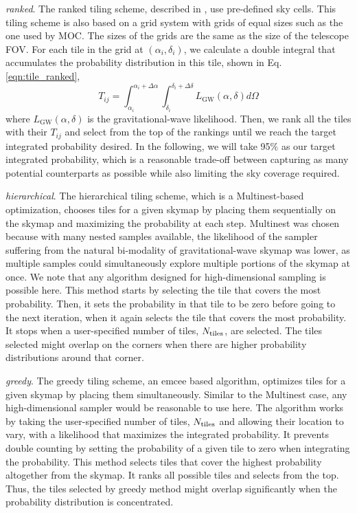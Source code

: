\documentclass[twocolumn]{aastex62}
\begin{document}
\emph{ranked}. The ranked tiling scheme, described in \cite{GhBl2016}, use pre-defined sky cells. This tiling scheme is also based on a grid system with grids of equal sizes such as the one used by MOC. The sizes of the grids are the same as the size of the telescope FOV. For each tile in the grid at $(\alpha_i, \delta_i)$, we calculate a double integral that accumulates the probability distribution in this tile, shown in Eq.\ref{eqn:tile_ranked},
\begin{equation}\label{eqn:tile_ranked}
T_{ij} = \int_{\alpha_i}^{\alpha_i+\Delta \alpha}\int_{\delta_i}^{\delta_i+\Delta \delta}L_\textrm{GW}(\alpha,\delta)d\Omega
\end{equation}
where $L_\textrm{GW}(\alpha,\delta)$ is the gravitational-wave likelihood.
Then, we rank all the tiles with their $T_{ij}$ and select from the top of the rankings until we reach the target integrated probability desired.
In the following, we will take 95\% as our target integrated probability, which is a reasonable trade-off between capturing as many potential counterparts as possible while also limiting the sky coverage required.

\emph{hierarchical}. The hierarchical tiling scheme, which is a Multinest-based \citep{FeHo2009,FeGa2009,BuGe2014} optimization, chooses tiles for a given skymap by placing them sequentially on the skymap and maximizing the probability at each step. Multinest was chosen because with many nested samples available, the likelihood of the sampler suffering from the natural bi-modality of gravitational-wave skymap was lower, as multiple samples could simultaneously explore multiple portions of the skymap at once. We note that any algorithm designed for high-dimensional sampling is possible here. This method starts by selecting the tile that covers the most probability. Then, it sets the probability in that tile to be zero before going to the next iteration, when it again selects the tile that covers the most probability. It stops when a user-specified number of tiles, $N_{\rm tiles}$, are selected. The tiles selected might overlap on the corners when there are higher probability distributions around that corner. 
 
\emph{greedy}. The greedy tiling scheme, an emcee \citep{FoHo2013} based algorithm, optimizes tiles for a given skymap by placing them simultaneously. Similar to the Multinest case, any high-dimensional sampler would be reasonable to use here. The algorithm works by taking the user-specified number of tiles, $N_{\rm tiles}$ and allowing their location to vary, with a likelihood that maximizes the integrated probability. It prevents double counting by setting the probability of a given tile to zero when integrating the probability. This method selects tiles that cover the highest probability altogether from the skymap. It ranks all possible tiles and selects from the top. Thus, the tiles selected by greedy method might overlap significantly when the probability distribution is concentrated. 
\end{document}
